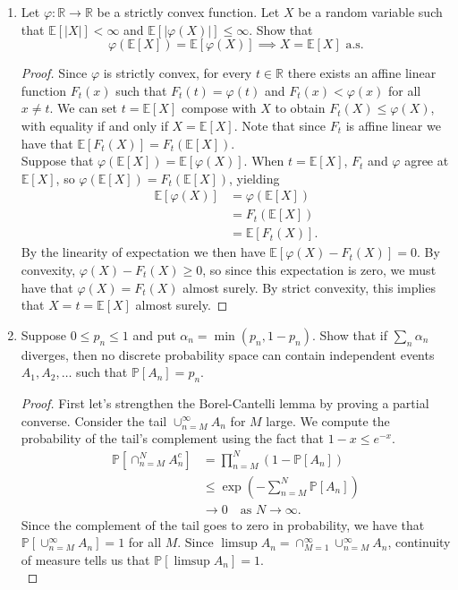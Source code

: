 \documentclass[11pt,letterpaper]{report}
\newcommand{\reals}{\mathbb{R}}
\newcommand{\E}{\mathbb{E}}
\newcommand{\Prob}{\mathbb{P}}
\begin{document}
\begin{enumerate}
	\item Let $\varphi:\reals\to \reals$ be a strictly convex function. Let $X$ be a random variable such that $\E[|X|]<\infty$ and $\E[|\varphi(X)|]\leq \infty$. Show that
	\[
	\varphi(\E[X]) = \E[\varphi(X)] \implies X = \E[X]\text{ a.s.}
	\]
	\begin{proof}
		Since $\varphi$ is strictly convex, for every $t\in \reals$ there exists an affine linear function $F_t(x)$ such that $F_t(t) = \varphi(t)$ and $F_t(x)<\varphi(x)$ for all $x\neq t$. We can set $t = \E[X]$ compose with $X$ to obtain $F_t(X)\leq\varphi(X)$, with equality if and only if $X = \E[X]$. Note that since $F_t$ is affine linear we have that $\E[F_t(X)] = F_t(\E[X])$.\\

		\noindent Suppose that $\varphi(\E[X]) = \E[\varphi(X)]$. When $t = \E[X]$, $F_t$ and $\varphi$ agree at $\E[X]$, so $\varphi(\E[X]) = F_t(\E[X])$, yielding
		\begin{align*}
			\E[\varphi(X)] &= \varphi(\E[X])\\
			&= F_t(\E[X])\\
			&= \E[F_t(X)].
		\end{align*}
		By the linearity of expectation we then have $\E[\varphi(X) - F_t(X)] = 0$. By convexity, $\varphi(X) - F_t(X)\geq 0$, so since this expectation is zero, we must have that $\varphi(X) = F_t(X)$ almost surely. By strict convexity, this implies that $X = t = \E[X]$ almost surely.
	\end{proof}

	\item Suppose $0\leq p_n\leq 1$ and put $\alpha_n = \min(p_n, 1-p_n)$. Show that if $\sum_n\alpha_n$ diverges, then no discrete probability space can contain independent events $A_1, A_2, \ldots$ such that $\Prob[A_n] = p_n$.
	\begin{proof}
		First let's strengthen the Borel-Cantelli lemma by proving a partial converse. Consider the tail $\cup_{n=M}^\infty A_n$ for $M$ large. We compute the probability of the tail's complement using the fact that $1-x\leq e^{-x}$.
		\begin{align*}
			\Prob[\cap_{n=M}^NA_n^c] &= \prod_{n=M}^N(1-\Prob[A_n])\\
			&\leq \exp\left(-\sum_{n=M}^N\Prob[A_n]\right)\\
			&\to 0\quad\text{as }N\to \infty.
		\end{align*}
		Since the complement of the tail goes to zero in probability, we have that $\Prob[\cup_{n=M}^\infty A_n] = 1$ for all $M$. Since $\limsup A_n = \cap_{M=1}^\infty \cup_{n=M}^\infty A_n$, continuity of measure tells us that $\Prob[\limsup A_n] = 1$.\\


\end{proof}
\end{enumerate}
\end{document}
